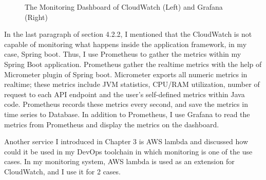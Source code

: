 \begin{figure}[!tbp]
\begin{minipage}[b]{0.50\textwidth}
     \end{minipage}
     \caption{The Monitoring Dashboard of CloudWatch (Left) and Grafana (Right)}
     \label{fig:monitoring}
   \end{figure}
\par
In the last paragraph of section 4.2.2, I mentioned that the CloudWatch is not capable of monitoring what happens inside the application framework, in my case, Spring boot. Thus, I use Prometheus to gather the metrics within my Spring Boot application. Prometheus gather the realtime metrics with the help of Micrometer plugin of Spring boot. Micrometer exports all numeric metrics in realtime; these metrics include JVM statistics, CPU/RAM utilization, number of request to each API endpoint and the user's self-defined metrics within Java code. Prometheus records these metrics every second, and save the metrics in time series to Database. In addition to Prometheus, I use Grafana to read the metrics from Prometheus and display the metrics on the dashboard.
\par
Another service I introduced in Chapter 3 is AWS lambda and discussed how could it be used in my DevOps toolchain in which monitoring is one of the use cases. In my monitoring system, AWS lambda is used as an extension for CloudWatch, and I use it for 2 cases.
